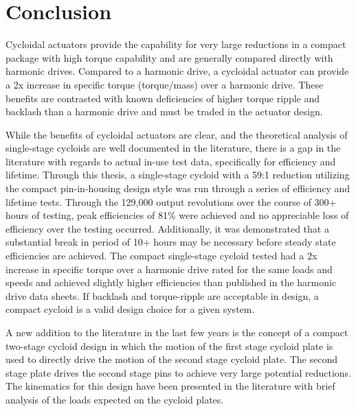 
\chapter{Conclusion}\label{ch:conclusion}

Cycloidal actuators provide the capability for very large reductions in a compact package with high torque capability and are generally compared directly with harmonic drives. Compared to a harmonic drive, a cycloidal actuator can provide a 2x increase in specific torque (torque/mass) over a harmonic drive. These benefits are contrasted with known deficiencies of higher torque ripple and backlash than a harmonic drive and must be traded in the actuator design. 

While the benefits of cycloidal actuators are clear, and the theoretical analysis of single-stage cycloids are well documented in the literature, there is a gap in the literature with regards to actual in-use test data, specifically for efficiency and lifetime. Through this thesis, a single-stage cycloid with a 59:1 reduction utilizing the compact pin-in-housing design style was run through a series of efficiency and lifetime tests. Through the 129,000 output revolutions over the course of 300+ hours of testing, peak efficiencies of 81\% were achieved and no appreciable loss of efficiency over the testing occurred. Additionally, it was demonstrated that a substantial break in period of 10+ hours may be necessary before steady state efficiencies are achieved. The compact single-stage cycloid tested had a 2x increase in specific torque over a harmonic drive rated for the same loads and speeds and achieved slightly higher efficiencies than published in the harmonic drive data sheets. If backlash and torque-ripple are acceptable in design, a compact cycloid is a valid design choice for a given system. 

A new addition to the literature in the last few years is the concept of a compact two-stage cycloid design in which the motion of the first stage cycloid plate is used to directly drive the motion of the second stage cycloid plate. The second stage plate drives the second stage pins to achieve very large potential reductions. The kinematics for this design have been presented in the literature with brief analysis of the loads expected on the cycloid plates. 

